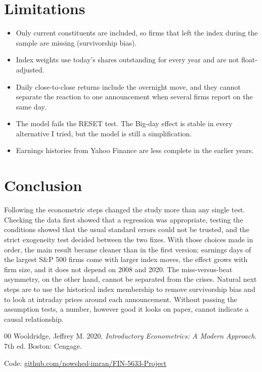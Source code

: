 \documentclass[preprint,letterpaper,11pt,authoryear]{elsarticle}
\begin{document}
\section{Limitations}
\begin{itemize}
  \item Only current constituents are included, so firms that left the index during the sample are missing (survivorship bias).
  \item Index weights use today's shares outstanding for every year and are not float-adjusted.
  \item Daily close-to-close returns include the overnight move, and they cannot separate the reaction to one announcement when several firms report on the same day.
  \item The model fails the RESET test. The Big-day effect is stable in every alternative I tried, but the model is still a simplification.
  \item Earnings histories from Yahoo Finance are less complete in the earlier years.
\end{itemize}

\section{Conclusion}
Following the econometric steps changed the study more than any single test. Checking the data first showed that a regression was appropriate, testing the conditions showed that the usual standard errors could not be trusted, and the strict exogeneity test decided between the two fixes. With those choices made in order, the main result became cleaner than in the first version: earnings days of the largest S\&P 500 firms come with larger index moves, the effect grows with firm size, and it does not depend on 2008 and 2020. The miss-versus-beat asymmetry, on the other hand, cannot be separated from the crises. Natural next steps are to use the historical index membership to remove survivorship bias and to look at intraday prices around each announcement. Without passing the assumption tests, a number, however good it looks on paper, cannot indicate a causal relationship.

\begin{thebibliography}{00}
 Wooldridge, Jeffrey M. 2020. \textit{Introductory Econometrics: A Modern Approach}. 7th ed. Boston: Cengage.
\end{thebibliography}

\vspace{6pt}
\noindent Code: \href{https://github.com/nowshed-imran/FIN-5633-Project}{github.com/nowshed-imran/FIN-5633-Project}
\end{document}
